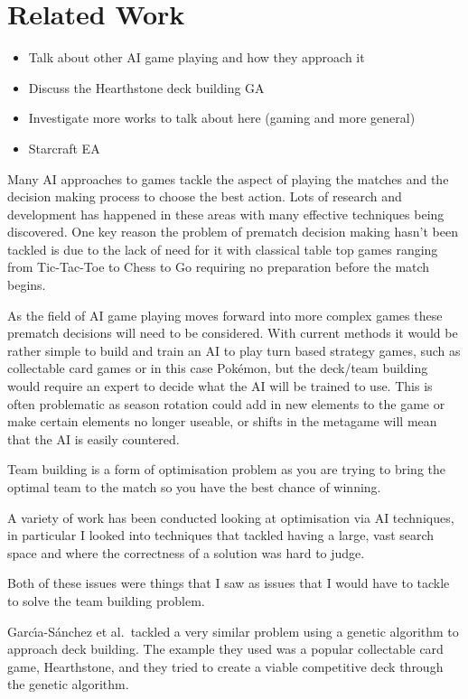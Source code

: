\documentclass[a4paper]{article}
\newcommand{\Pokemon}{Pok\'{e}mon}
\begin{document}
\section{Related Work}
\begin{itemize}
    \item Talk about other AI game playing and how they approach it
    \item Discuss the Hearthstone deck building GA
    \item Investigate more works to talk about here (gaming and more general)
    \item Starcraft EA\cite{starcraftEA}
\end{itemize}
\par
Many AI approaches to games tackle the aspect of playing the matches and the decision making process to choose the best action.
Lots of research and development has happened in these areas with many effective techniques being discovered.
One key reason the problem of prematch decision making hasn't been tackled is due to the lack of need for it with classical table top games ranging from Tic-Tac-Toe to Chess to Go requiring no preparation before the match begins.
\par
As the field of AI game playing moves forward into more complex games these prematch decisions will need to be considered.
With current methods it would be rather simple to build and train an AI to play turn based strategy games, such as collectable card games or in this case \Pokemon{}, but the deck/team building would require an expert to decide what the AI will be trained to use.
This is often problematic as season rotation could add in new elements to the game or make certain elements no longer useable, or shifts in the metagame will mean that the AI is easily countered.
\par
Team building is a form of optimisation problem as you are trying to bring the optimal team to the match so you have the best chance of winning.

A variety of work has been conducted looking at optimisation via AI techniques, in particular I looked into techniques that tackled having a large, vast search space and where the correctness of a solution was hard to judge.

Both of these issues were things that I saw as issues that I would have to tackle to solve the team building problem.
\\ \par
Garc{\'\i}a-S{\'a}nchez et al.\ tackled a very similar problem using a genetic algorithm to approach deck building\cite{hearthstoneAI}.
The example they used was a popular collectable card game, Hearthstone, and they tried to create a viable competitive deck through the genetic algorithm.
\end{document}
